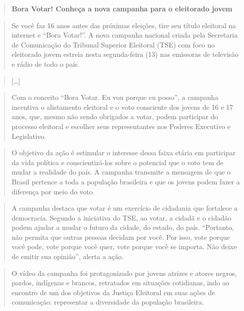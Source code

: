 \begin{quote}
\textbf{Bora Votar! Conheça a nova campanha para o eleitorado jovem}
\end{quote}

\begin{quote}
Se você faz 16 anos antes das próximas eleições, tire seu título
eleitoral na internet e ``Bora Votar!''. A nova campanha nacional criada
pela Secretaria de Comunicação do Tribunal Superior Eleitoral (TSE) com
foco no eleitorado jovem estreia nesta segunda-feira (13) nas emissoras
de televisão e rádio de todo o país.
\end{quote}

\begin{quote}
{[}\ldots{]}
\end{quote}

\begin{quote}
Com o conceito ``Bora Votar. Eu vou porque eu posso'', a campanha
incentiva o alistamento eleitoral e o voto consciente dos jovens de 16 e
17 anos, que, mesmo não sendo obrigados a votar, podem participar do
processo eleitoral e escolher seus representantes nos Poderes Executivo
e Legislativo.
\end{quote}

\begin{quote}
O objetivo da ação é estimular o interesse dessa faixa etária em
participar da vida política e conscientizá-los sobre o potencial que o
voto tem de mudar a realidade do país. A campanha transmite a mensagem
de que o Brasil pertence a toda a população brasileira e que os jovens
podem fazer a diferença por meio do voto.
\end{quote}

\begin{quote}
A campanha destaca que votar é um exercício de cidadania que fortalece a
democracia. Segundo a iniciativa do TSE, ao votar, a cidadã e o cidadão
podem ajudar a mudar o futuro da cidade, do estado, do país. ``Portanto,
não permita que outras pessoas decidam por você. Por isso, vote porque
você pode, vote porque você quer, vote porque você se importa. Não deixe
de emitir sua opinião'', alerta a ação.
\end{quote}

\begin{quote}
O vídeo da campanha foi protagonizado por jovens atrizes e atores
negros, pardos, indígenas e brancos, retratados em situações cotidianas,
indo ao encontro de um dos objetivos da Justiça Eleitoral em suas ações
de comunicação: representar a diversidade da população brasileira.
\end{quote}

